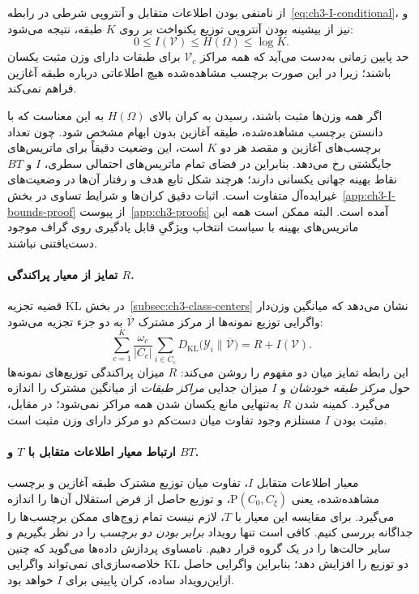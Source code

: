 از نامنفی بودن اطلاعات متقابل و آنتروپی شرطی در رابطه~\eqref{eq:ch3-I-conditional}، و نیز از بیشینه بودن آنتروپی توزیع یکنواخت بر روی $K$ طبقه، نتیجه می‌شود:
\begin{equation}\label{eq:ch3-I-bounds}
\boxed{0\le I(\mathcal V)\le H(\Omega)\le\log K.}
\end{equation}
حد پایین زمانی به‌دست می‌آید که همه مراکز $\mathcal V_c$ برای طبقات دارای وزن مثبت یکسان باشند؛ زیرا در این صورت برچسب مشاهده‌شده هیچ اطلاعاتی درباره طبقه آغازین فراهم نمی‌کند.

اگر همه وزن‌ها مثبت باشند، رسیدن به کران بالای $H(\Omega)$ به این معناست که با دانستن برچسب مشاهده‌شده، طبقه آغازین بدون ابهام مشخص شود. چون تعداد برچسب‌های آغازین و مقصد هر دو $K$ است، این وضعیت دقیقاً برای ماتریس‌های جایگشتی رخ می‌دهد. بنابراین در فضای تمام ماتریس‌های احتمالی سطری، $I$ و $BT$ نقاط بهینه جهانی یکسانی دارند؛ هرچند شکل تابع هدف و رفتار آن‌ها در وضعیت‌های غیرایده‌آل متفاوت است. اثبات دقیق کران‌ها و شرایط تساوی در بخش~\ref{app:ch3-I-bounds-proof} از پیوست~\ref{app:ch3-proofs} آمده است. البته ممکن است همه این ماتریس‌های بهینه با سیاست انتخاب ویژگیِ قابل یادگیری روی گراف موجود دست‌یافتنی نباشند.

\paragraph{تمایز از معیار پراکندگی $R$.}
قضیه تجزیه KL در بخش~\ref{subsec:ch3-class-centers} نشان می‌دهد که میانگین وزن‌دار واگرایی توزیع نمونه‌ها از مرکز مشترک $\overline{\mathcal V}$ به دو جزء تجزیه می‌شود:
\begin{equation}\label{eq:ch3-R-I-decomposition}
\boxed{
\sum_{c=1}^{K}\frac{\omega_c}{|C_c|}
\sum_{i\in C_c}
D_{\mathrm{KL}}\bigl(\mathscr Y_i\|\overline{\mathcal V}\bigr)
=R+I(\mathcal V).
}
\end{equation}
این رابطه تمایز میان دو مفهوم را روشن می‌کند: $R$ میزان پراکندگی توزیع‌های نمونه‌ها حول \emph{مرکز طبقه خودشان} و $I$ میزان جدایی \emph{مراکز طبقات} از میانگین مشترک را اندازه می‌گیرد. کمینه شدن $R$ به‌تنهایی مانع یکسان شدن همه مراکز نمی‌شود؛ در مقابل، مثبت بودن $I$ مستلزم وجود تفاوت میان دست‌کم دو مرکز دارای وزن مثبت است.

\paragraph{ارتباط معیار اطلاعات متقابل با $T$ و $BT$.}
معیار اطلاعات متقابل $I$، تفاوت میان توزیع مشترک طبقه آغازین و برچسب مشاهده‌شده، یعنی $\mathrm P(C_0,C_\xi)$، و توزیع حاصل از فرض استقلال آن‌ها را اندازه می‌گیرد. برای مقایسه این معیار با $T$، لازم نیست تمام زوج‌های ممکن برچسب‌ها را جداگانه بررسی کنیم. کافی است تنها رویداد \emph{برابر بودن دو برچسب} را در نظر بگیریم و سایر حالت‌ها را در یک گروه قرار دهیم. نامساوی پردازش داده‌ها می‌گوید که چنین خلاصه‌سازی‌ای نمی‌تواند واگرایی KL دو توزیع را افزایش دهد؛ بنابراین واگرایی حاصل ازاین‌رویداد ساده، کران پایینی برای $I$ خواهد بود.

